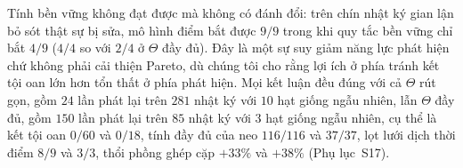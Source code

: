 Tính bền vững không đạt được mà không có đánh đổi: trên chín nhật ký gian lận bỏ sót
thật sự bị sửa, mô hình điểm bắt được $9/9$ trong khi quy tắc bền vững chỉ bắt $4/9$
($4/4$ so với $2/4$ ở $\Theta$ đầy đủ). Đây là một sự suy giảm năng lực phát hiện chứ
không phải cải thiện Pareto, dù chúng tôi cho rằng lợi ích ở phía tránh kết tội oan lớn
hơn tổn thất ở phía phát hiện. Mọi kết luận đều đúng với cả $\Theta$ rút gọn, gồm $24$
lần phát lại trên $281$ nhật ký với $10$ hạt giống ngẫu nhiên, lẫn $\Theta$ đầy đủ, gồm
$150$ lần phát lại trên $85$ nhật ký với $3$ hạt giống ngẫu nhiên, cụ thể là kết tội oan
$0/60$ và $0/18$, tính đầy đủ của neo $116/116$ và $37/37$, lọt lưới dịch thời điểm $8/9$
và $3/3$, thổi phồng ghép cặp $+33\%$ và $+38\%$ (Phụ lục~S17).